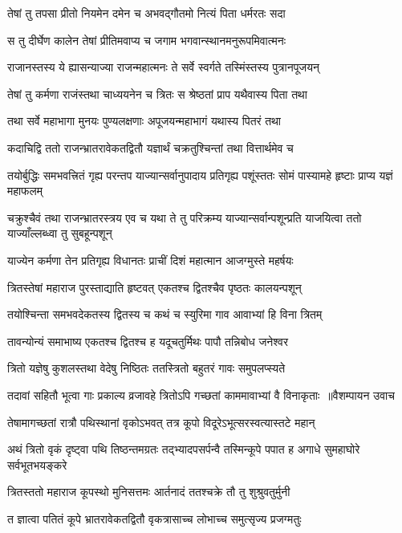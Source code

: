 \twolineshloka
{तेषां तु तपसा प्रीतो नियमेन दमेन च}
{अभवद्गौतमो नित्यं पिता धर्मरतः सदा}


\twolineshloka
{स तु दीर्घेण कालेन तेषां प्रीतिमवाप्य च}
{जगाम भगवान्स्थानमनुरूपमिवात्मनः}


\twolineshloka
{राजानस्तस्य ये ह्यासन्याज्या राजन्महात्मनः}
{ते सर्वे स्वर्गते तस्मिंस्तस्य पुत्रानपूजयन्}


\twolineshloka
{तेषां तु कर्मणा राजंस्तथा चाध्ययनेन च}
{त्रितः स श्रेष्ठतां प्राप यथैवास्य पिता तथा}


\twolineshloka
{तथा सर्वे महाभागा मुनयः पुण्यलक्षणाः}
{अपूजयन्महाभागं यथास्य पितरं तथा}


\twolineshloka
{कदाचिद्वि ततो राजन्भ्रातरावेकतद्वितौ}
{यज्ञार्थं चक्रतुश्चिन्तां तथा वित्तार्थमेव च}


\threelineshloka
{तयोर्बुद्धिः समभवत्त्रितं गृह्य परन्तप}
{याज्यान्सर्वानुपादाय प्रतिगृह्य पशूंस्ततः}
{सोमं पास्यामहे हृष्टाः प्राप्य यज्ञं महाफलम्}


\threelineshloka
{चक्रुश्चैवं तथा राजन्भ्रातरस्त्रय एव च}
{यथा ते तु परिक्रम्य याज्यान्सर्वान्पशून्प्रति}
{याजयित्वा ततो याज्याँल्लब्ध्वा तु सुबहून्पशून्}


\twolineshloka
{याज्येन कर्मणा तेन प्रतिगृह्य विधानतः}
{प्राचीं दिशं महात्मान आजग्मुस्ते महर्षयः}


\twolineshloka
{त्रितस्तेषां महाराज पुरस्ताद्याति हृष्टवत्}
{एकतश्च द्वितश्चैव पृष्ठतः कालयन्पशून्}


\twolineshloka
{तयोश्चिन्ता समभवदेकतस्य द्वितस्य च}
{कथं च स्युरिमा गाव आवाभ्यां हि विना त्रितम्}


\twolineshloka
{तावन्योन्यं समाभाष्य एकतश्च द्वितश्च ह}
{यदूचतुर्मिथः पापौ तन्निबोध जनेश्वर}


\twolineshloka
{त्रितो यज्ञेषु कुशलस्तथा वेदेषु निष्ठितः}
{ततस्त्रितो बहुतरं गावः समुपलप्स्यते}


\threelineshloka
{तदावां सहितौ भूत्वा गाः प्रकाल्य व्रजावहे}
{त्रितोऽपि गच्छतां काममावाभ्यां वै विनाकृताः ॥वैशम्पायन उवाच}
{}


\twolineshloka
{तेषामागच्छतां रात्रौ पथिस्थानां वृकोऽभवत्}
{तत्र कूपो विदूरेऽभूत्सरस्वत्यास्तटे महान्}


\threelineshloka
{अथं त्रितो वृकं दृष्ट्वा पथि तिष्ठन्तमग्रतः}
{तद्भ्यादपसर्पन्वै तस्मिन्कूपे पपात ह}
{अगाधे सुमहाघोरे सर्वभूतभयङ्करे}


\twolineshloka
{त्रितस्ततो महाराज कूपस्थो मुनिसत्तमः}
{आर्तनादं ततश्चक्रे तौ तु शुश्रुवतुर्मुनी}


\twolineshloka
{त ज्ञात्वा पतितं कूपे भ्रातरावेकतद्वितौ}
{वृकत्रासाच्च लोभाच्च समुत्सृज्य प्रजग्मतुः}


